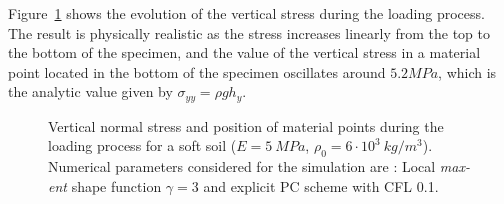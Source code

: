\documentclass[preprint,12pt,a4paper]{elsarticle}
\begin{document}
Figure~\ref{fig:Block-LME3} shows the evolution of the vertical stress
during the loading process. The result is physically realistic as
the stress increases linearly from the top to the bottom of the specimen,
and the value of the vertical stress in a material point located in
the bottom of the specimen oscillates around $5.2 MPa$, which is
the analytic value given by $\sigma_{yy} = \rho g h_y$.
\begin{figure}
  \centering
  \caption{Vertical normal stress and position of material points
    during the loading process for a soft soil ($E = 5\ MPa$, $\rho_0
    = 6\cdot 10^3\ kg/m^3$). Numerical parameters considered for the
    simulation are : Local \textit{max-ent} shape function $\gamma =3$
    and explicit PC scheme with CFL 0.1.}
  \label{fig:Block-LME3}
\end{figure}
\end{document}

